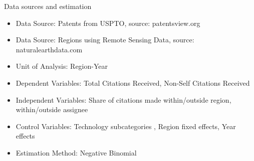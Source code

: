 \documentclass{beamer}
\begin{document}
\begin{frame}{Data sources and estimation}{}
\begin{itemize}
\item{Data Source: Patents from USPTO, source: patentsview.org}
\item{Data Source: Regions using Remote Sensing Data, source: naturalearthdata.com}
\item{Unit of Analysis: Region-Year}
\item{Dependent Variables: Total Citations Received, Non-Self Citations Received}
\item{Independent Variables: Share of citations made within/outside region, within/outside assignee}
\item{Control Variables: Technology subcategories \citep*{Hall2001a}, Region fixed effects, Year effects}
\item{Estimation Method: Negative Binomial}
\end{itemize}
\end{frame}
\end{document}

